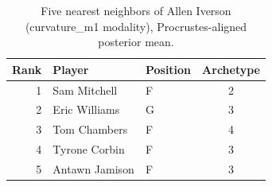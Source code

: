 \begin{table}[htbp]
  \centering\small
  \begin{tabular}{rllc}
    \toprule
    Rank & Player & Position & Archetype \\
    \midrule
    1 & Sam Mitchell & F & 2 \\
    2 & Eric Williams & G & 3 \\
    3 & Tom Chambers & F & 4 \\
    4 & Tyrone Corbin & F & 3 \\
    5 & Antawn Jamison & F & 3 \\
    \bottomrule
  \end{tabular}
  \caption{Five nearest neighbors of Allen Iverson (curvature_m1 modality), Procrustes-aligned posterior mean.}
  \label{tab:Allen_Iverson_neighbors_curvature_m1}
\end{table}


